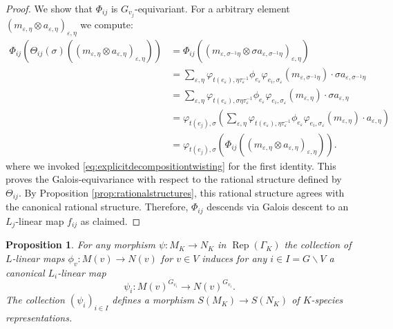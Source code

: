 \documentclass[a4paper,12pt,reqno]{amsart}
\DeclareMathOperator{\Rep}{\mathrm{Rep}}
\theoremstyle{plain}
\newtheorem{proposition}[theorem]{Proposition}
\theoremstyle{remark}
\begin{document}
    \begin{proof}
      We show that $\Phi_{ij}$ is $G_{v_j}$-equivariant. For a arbitrary element $(m_{\varepsilon,\eta}\otimes a_{\varepsilon,\eta})_{\varepsilon,\eta}$ we compute:
      \begin{align*}
      \Phi_{ij}\left(\Theta_{ij}(\sigma)((m_{\varepsilon,\eta}\otimes a_{\varepsilon,\eta})_{\varepsilon,\eta})\right)
      &=
      \Phi_{ij}\left((m_{\varepsilon,\sigma^{-1}\eta}\otimes \sigma a_{\varepsilon,\sigma^{-1}\eta} )_{\varepsilon,\eta}\right)\\
      &=
      \sum_{\varepsilon,\eta}
      \varphi_{t(e_\varepsilon),\eta\tau_\varepsilon^{-1}}\phi_{e_\varepsilon}\varphi_{e_i,\sigma_\varepsilon}(m_{\varepsilon,\sigma^{-1}\eta})\cdot \sigma a_{\varepsilon,\sigma^{-1}\eta}\\
      &=
      \sum_{\varepsilon,\eta}
      \varphi_{t(e_\varepsilon),\sigma\eta\tau_\varepsilon^{-1}}\phi_{e_\varepsilon}\varphi_{e_i,\sigma_\varepsilon}(m_{\varepsilon,\eta})\cdot \sigma a_{\varepsilon,\eta}\\
      &=
      \varphi_{t(e_j),\sigma}
      \left(
      \sum_{\varepsilon,\eta}
      \varphi_{t(e_\varepsilon),\eta\tau_\varepsilon^{-1}}\phi_{e_\varepsilon}\varphi_{e_i,\sigma_\varepsilon}(m_{\varepsilon,\eta})\cdot a_{\varepsilon,\eta}
      \right)\\
      &=
      \varphi_{t(e_j),\sigma}
      \left(
      \Phi_{ij}\left((m_{\varepsilon,\eta}\otimes a_{\varepsilon,\eta})_{\varepsilon,\eta}\right)
      \right).
      \end{align*}
      where we invoked \eqref{eq:explicitdecompositiontwisting} for the first identity. This proves the Galois-equivariance with respect to the rational structure defined by $\Theta_{ij}$. By Proposition \ref{prop:rationalstructures}, this rational structure agrees with the canonical rational structure. Therefore, $\Phi_{ij}$ descends via Galois descent to an $L_j$-linear map $f_{ij}$ as claimed.
    \end{proof}

    \begin{proposition}
      For any morphism $\psi \colon M_K \to N_K$ in $\Rep(\Gamma_K)$ the collection of $L$-linear maps $\phi_v \colon M(v) \to N(v)$ for $v\in V$ induces for any $i\in I=G\backslash V$ a canonical $L_i$-linear map
      \[
      \psi_{i}\colon M(v)^{G_{v_i}}\to N(v)^{G_{v_i}}.
      \]
      The collection $(\psi_i)_{i\in I}$ defines a morphism $S(M_K)\to S(N_K)$ of $K$-species representations.
      \end{proposition}
\end{document}
